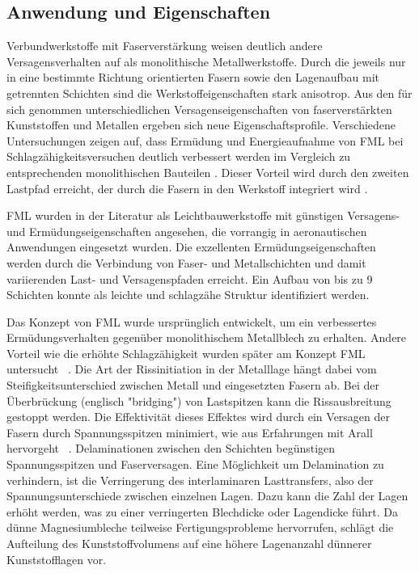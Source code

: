 \subsection{Anwendung und Eigenschaften}\label{sec:Anwendung}

Verbundwerkstoffe mit Faserverstärkung weisen deutlich andere Versagensverhalten auf als monolithische Metallwerkstoffe.
Durch die jeweils nur in eine bestimmte Richtung orientierten Fasern sowie den Lagenaufbau mit getrennten Schichten sind die Werkstoffeigenschaften stark anisotrop.
Aus den für sich genommen unterschiedlichen Versagenseigenschaften von faserverstärkten Kunststoffen und Metallen ergeben sich neue Eigenschaftsprofile.
Verschiedene Untersuchungen zeigen auf, dass Ermüdung und Energieaufnahme von FML bei Schlagzähigkeitsversuchen deutlich verbessert werden im Vergleich zu entsprechenden monolithischen Bauteilen \cite{Cortes.2005,Botelho.2006}.
Dieser Vorteil wird durch den zweiten Lastpfad erreicht, der durch die Fasern in den Werkstoff integriert wird \cite{Beumler.2004}.

FML wurden in der Literatur als Leichtbauwerkstoffe mit günstigen Versagens- und Ermüdungseigenschaften angesehen, die vorrangig in aeronautischen Anwendungen eingesetzt wurden.
Die exzellenten Ermüdungseigenschaften werden durch die Verbindung von Faser- und Metallschichten und damit variierenden Last- und Versagenspfaden erreicht.
Ein Aufbau von bis zu 9 Schichten konnte als leichte und schlagzähe Struktur identifiziert werden. \cite{Parnanen.2012}

Das Konzept von FML wurde ursprünglich entwickelt, um ein verbessertes Ermüdungsverhalten gegenüber monolithischem Metallblech zu erhalten.
Andere Vorteil wie die erhöhte Schlagzähigkeit wurden später am Konzept FML untersucht \cite{Alderliesten.2008}~.
Die Art der Rissinitiation in der Metalllage hängt dabei vom Steifigkeitsunterschied zwischen Metall und eingesetzten Fasern ab.
Bei der Überbrückung (englisch "bridging") von Lastspitzen kann die Rissausbreitung gestoppt werden.
Die Effektivität dieses Effektes wird durch ein Versagen der Fasern durch Spannungsspitzen minimiert, wie aus Erfahrungen mit Arall hervorgeht \cite{Marissen.1988}~.
Delaminationen zwischen den Schichten begünstigen Spannungsspitzen und Faserversagen.
Eine Möglichkeit um Delamination zu verhindern, ist die Verringerung des interlaminaren Lasttransfers, also der Spannungsunterschiede zwischen einzelnen Lagen.
Dazu kann die Zahl der Lagen erhöht werden, was zu einer verringerten Blechdicke oder Lagendicke führt.
Da dünne Magnesiumbleche teilweise Fertigungsprobleme hervorrufen, schlägt \cite{Alderliesten.2008} die Aufteilung des Kunststoffvolumens auf eine höhere Lagenanzahl dünnerer Kunststofflagen vor.

